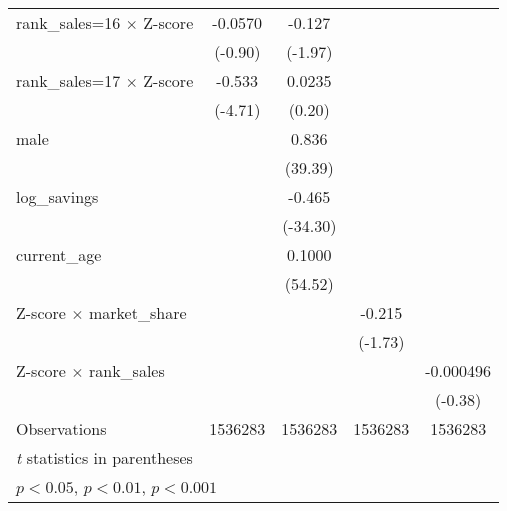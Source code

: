 {\begin{tabular}{l*{4}{c}}
rank\_sales=16 $\times$ Z-score&     -0.0570         &      -0.127\sym{*}  &                     &                     \\
                    &     (-0.90)         &     (-1.97)         &                     &                     \\
rank\_sales=17 $\times$ Z-score&      -0.533\sym{***}&      0.0235         &                     &                     \\
                    &     (-4.71)         &      (0.20)         &                     &                     \\
male                &                     &       0.836\sym{***}&                     &                     \\
                    &                     &     (39.39)         &                     &                     \\
log\_savings         &                     &      -0.465\sym{***}&                     &                     \\
                    &                     &    (-34.30)         &                     &                     \\
current\_age         &                     &      0.1000\sym{***}&                     &                     \\
                    &                     &     (54.52)         &                     &                     \\
Z-score $\times$ market\_share&                     &                     &      -0.215         &                     \\
                    &                     &                     &     (-1.73)         &                     \\
Z-score $\times$ rank\_sales&                     &                     &                     &   -0.000496         \\
                    &                     &                     &                     &     (-0.38)         \\
\hline
Observations        &     1536283         &     1536283         &     1536283         &     1536283         \\
\hline\hline
\multicolumn{5}{l}{\footnotesize \textit{t} statistics in parentheses}\\
\multicolumn{5}{l}{\footnotesize \sym{*} \(p<0.05\), \sym{**} \(p<0.01\), \sym{***} \(p<0.001\)}\\
\end{tabular}
}
